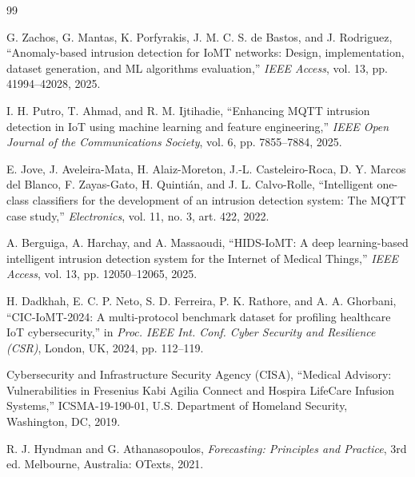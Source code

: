 \documentclass[12pt,a4paper]{report}
\begin{document}
\begin{thebibliography}{99}

G. Zachos, G. Mantas, K. Porfyrakis, J. M. C. S. de Bastos, and J. Rodriguez, ``Anomaly-based intrusion detection for IoMT networks: Design, implementation, dataset generation, and ML algorithms evaluation,'' \textit{IEEE Access}, vol. 13, pp. 41994--42028, 2025.

I. H. Putro, T. Ahmad, and R. M. Ijtihadie, ``Enhancing MQTT intrusion detection in IoT using machine learning and feature engineering,'' \textit{IEEE Open Journal of the Communications Society}, vol. 6, pp. 7855--7884, 2025.

E. Jove, J. Aveleira-Mata, H. Alaiz-Moreton, J.-L. Casteleiro-Roca, D. Y. Marcos del Blanco, F. Zayas-Gato, H. Quinti{\'a}n, and J. L. Calvo-Rolle, ``Intelligent one-class classifiers for the development of an intrusion detection system: The MQTT case study,'' \textit{Electronics}, vol. 11, no. 3, art. 422, 2022.

A. Berguiga, A. Harchay, and A. Massaoudi, ``HIDS-IoMT: A deep learning-based intelligent intrusion detection system for the Internet of Medical Things,'' \textit{IEEE Access}, vol. 13, pp. 12050--12065, 2025.

H. Dadkhah, E. C. P. Neto, S. D. Ferreira, P. K. Rathore, and A. A. Ghorbani, ``CIC-IoMT-2024: A multi-protocol benchmark dataset for profiling healthcare IoT cybersecurity,'' in \textit{Proc. IEEE Int. Conf. Cyber Security and Resilience (CSR)}, London, UK, 2024, pp. 112--119.

Cybersecurity and Infrastructure Security Agency (CISA), ``Medical Advisory: Vulnerabilities in Fresenius Kabi Agilia Connect and Hospira LifeCare Infusion Systems,'' ICSMA-19-190-01, U.S. Department of Homeland Security, Washington, DC, 2019.

R. J. Hyndman and G. Athanasopoulos, \textit{Forecasting: Principles and Practice}, 3rd ed. Melbourne, Australia: OTexts, 2021.

\end{thebibliography}
\end{document}
